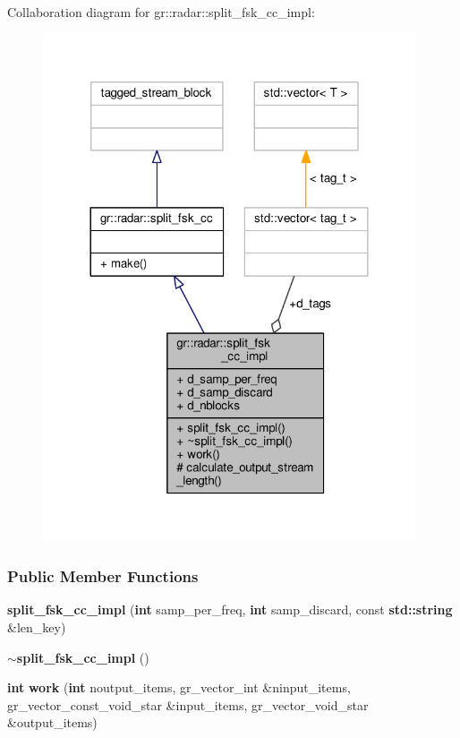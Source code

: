 Collaboration diagram for gr\+:\+:radar\+:\+:split\+\_\+fsk\+\_\+cc\+\_\+impl\+:
\nopagebreak
\begin{figure}[H]
\begin{center}
\leavevmode
\includegraphics[width=312pt]{dc/d95/classgr_1_1radar_1_1split__fsk__cc__impl__coll__graph}
\end{center}
\end{figure}
\subsubsection*{Public Member Functions}
\begin{DoxyCompactItemize}
\item 
{\bf split\+\_\+fsk\+\_\+cc\+\_\+impl} ({\bf int} samp\+\_\+per\+\_\+freq, {\bf int} samp\+\_\+discard, const {\bf std\+::string} \&len\+\_\+key)
\item 
{\bf $\sim$split\+\_\+fsk\+\_\+cc\+\_\+impl} ()
\item 
{\bf int} {\bf work} ({\bf int} noutput\+\_\+items, gr\+\_\+vector\+\_\+int \&ninput\+\_\+items, gr\+\_\+vector\+\_\+const\+\_\+void\+\_\+star \&input\+\_\+items, gr\+\_\+vector\+\_\+void\+\_\+star \&output\+\_\+items)
\end{DoxyCompactItemize}
